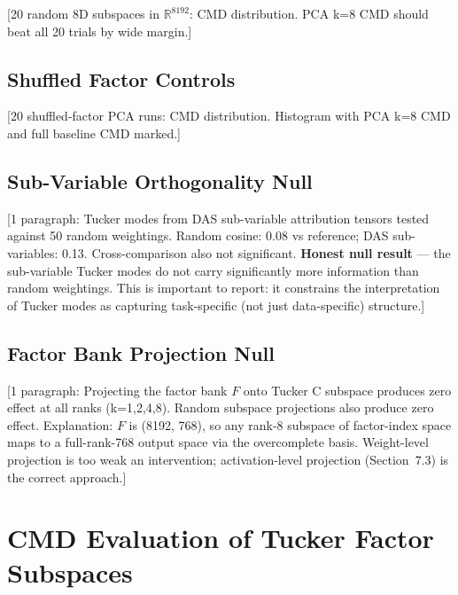 \documentclass[11pt]{article}
\begin{document}
[20 random 8D subspaces in $\mathbb{R}^{8192}$: CMD distribution.
PCA k=8 CMD should beat all 20 trials by wide margin.]

\subsection{Shuffled Factor Controls}

[20 shuffled-factor PCA runs: CMD distribution. Histogram with PCA
k=8 CMD and full baseline CMD marked.]

\subsection{Sub-Variable Orthogonality Null}

[1 paragraph: Tucker modes from DAS sub-variable attribution tensors
tested against 50 random weightings. Random cosine: 0.08 vs reference;
DAS sub-variables: 0.13. Cross-comparison also not significant.
\textbf{Honest null result} --- the sub-variable Tucker modes do not
carry significantly more information than random weightings. This is
important to report: it constrains the interpretation of Tucker modes
as capturing task-specific (not just data-specific) structure.]

\subsection{Factor Bank Projection Null}

[1 paragraph: Projecting the factor bank $F$ onto Tucker C subspace
produces zero effect at all ranks (k=1,2,4,8). Random subspace
projections also produce zero effect. Explanation: $F$ is (8192, 768),
so any rank-8 subspace of factor-index space maps to a full-rank-768
output space via the overcomplete basis. Weight-level projection is too
weak an intervention; activation-level projection (Section~7.3) is the
correct approach.]



\section{CMD Evaluation of Tucker Factor Subspaces}
\label{app:cmd_6tasks}

\end{document}
